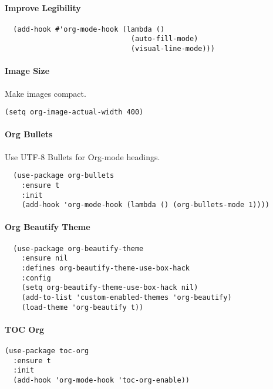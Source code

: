 \documentclass[11pt]{article}
\begin{document}
\paragraph*{Improve Legibility}
\label{sec:orgb943234}

\begin{verbatim}
  (add-hook #'org-mode-hook (lambda ()
                              (auto-fill-mode)
                              (visual-line-mode)))
\end{verbatim}

\paragraph*{Image Size}
\label{sec:org5534c0c}

Make images compact.

\begin{verbatim}
(setq org-image-actual-width 400)
\end{verbatim}

\paragraph*{Org Bullets}
\label{sec:orgcc217a5}

Use UTF-8 Bullets for Org-mode headings.

\begin{verbatim}
  (use-package org-bullets
    :ensure t
    :init
    (add-hook 'org-mode-hook (lambda () (org-bullets-mode 1))))

\end{verbatim}

\paragraph*{Org Beautify Theme}
\label{org-beautify-theme}
\begin{verbatim}
  (use-package org-beautify-theme
    :ensure nil
    :defines org-beautify-theme-use-box-hack
    :config
    (setq org-beautify-theme-use-box-hack nil)
    (add-to-list 'custom-enabled-themes 'org-beautify)
    (load-theme 'org-beautify t))
\end{verbatim}

\paragraph*{TOC Org}
\label{sec:org30e8b94}

\begin{verbatim}
(use-package toc-org
  :ensure t
  :init
  (add-hook 'org-mode-hook 'toc-org-enable))
\end{verbatim}
\end{document}
